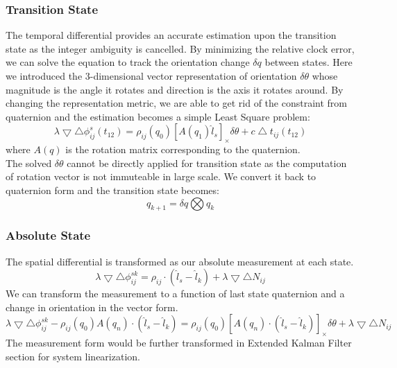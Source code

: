 \documentclass[journal,onecolumn]{IEEEtran}
\begin{document}
\subsubsection{Transition State}
The temporal differential provides an accurate estimation upon the transition state
as the integer ambiguity is cancelled. By minimizing the relative clock error, we
can solve the equation to track the orientation change $\delta q$ between states.
Here we introduced the 3-dimensional vector representation of orientation $\delta \theta$
whose magnitude is the angle it rotates and direction is the axis it rotates around.
By changing the representation metric, we are able to get rid of the constraint from
quaternion and the estimation becomes a simple Least Square problem:
\begin{equation}
  \lambda \bigtriangledown \bigtriangleup \phi_{ij}^{s}(t_{12})
  = \rho_{ij}(q_0)[A(q_1)\hat{l}_s]_{\times}\delta \theta + c\bigtriangleup t_{ij}(t_{12})
\end{equation}
where $A(q)$ is the rotation matrix corresponding to the quaternion.\\
The solved $\delta \theta$ cannot be directly applied for transition state as the
computation of rotation vector is not immuteable in large scale. We convert it back to
quaternion form and the transition state becomes:
\begin{equation}
  q_{k+1} = \delta q \bigotimes q_{k}
  \label{transition}
\end{equation}
\subsubsection{Absolute State}
The spatial differential is transformed as our absolute measurement at each state.
\begin{equation}
  \lambda \bigtriangledown \bigtriangleup \phi_{ij}^{sk} =
  \rho_{ij}\cdot(\hat{l}_s-\hat{l}_k) + \lambda\bigtriangledown \bigtriangleup N_{ij}
\end{equation}
We can transform the measurement to a function of last state quaternion and a change
in orientation in the vector form.
\begin{equation}
  \lambda \bigtriangledown \bigtriangleup \phi_{ij}^{sk} - \rho_{ij}(q_0)A(q_n)\cdot(\hat{l}_s-\hat{l}_k)
  =  \rho_{ij}(q_0)[A(q_n)\cdot(\hat{l}_s-\hat{l}_k)]_{\times}\delta \theta +
   \lambda\bigtriangledown \bigtriangleup N_{ij}
\end{equation}
The measurement form would be further transformed in Extended Kalman Filter section
for system linearization.
\end{document}
